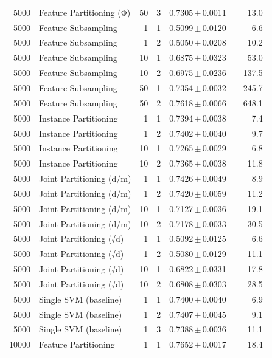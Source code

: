\begin{table}[ht]
\begin{tabular}{rlrrccr}
5000 & Feature Partitioning (Φ) & 50 & 3 & 0.7305\,$\pm$\,0.0011 &  & 13.0 \\
5000 & Feature Subsampling & 1 & 1 & 0.5099\,$\pm$\,0.0120 &  & 6.6 \\
5000 & Feature Subsampling & 1 & 2 & 0.5050\,$\pm$\,0.0208 &  & 10.2 \\
5000 & Feature Subsampling & 10 & 1 & 0.6875\,$\pm$\,0.0323 &  & 53.0 \\
5000 & Feature Subsampling & 10 & 2 & 0.6975\,$\pm$\,0.0236 &  & 137.5 \\
5000 & Feature Subsampling & 50 & 1 & 0.7354\,$\pm$\,0.0032 &  & 245.7 \\
5000 & Feature Subsampling & 50 & 2 & 0.7618\,$\pm$\,0.0066 &  & 648.1 \\
5000 & Instance Partitioning & 1 & 1 & 0.7394\,$\pm$\,0.0038 &  & 7.4 \\
5000 & Instance Partitioning & 1 & 2 & 0.7402\,$\pm$\,0.0040 &  & 9.7 \\
5000 & Instance Partitioning & 10 & 1 & 0.7265\,$\pm$\,0.0029 &  & 6.8 \\
5000 & Instance Partitioning & 10 & 2 & 0.7365\,$\pm$\,0.0038 &  & 11.8 \\
5000 & Joint Partitioning (d/m) & 1 & 1 & 0.7426\,$\pm$\,0.0049 &  & 8.9 \\
5000 & Joint Partitioning (d/m) & 1 & 2 & 0.7420\,$\pm$\,0.0059 &  & 11.2 \\
5000 & Joint Partitioning (d/m) & 10 & 1 & 0.7127\,$\pm$\,0.0036 &  & 19.1 \\
5000 & Joint Partitioning (d/m) & 10 & 2 & 0.7178\,$\pm$\,0.0033 &  & 30.5 \\
5000 & Joint Partitioning (√d) & 1 & 1 & 0.5092\,$\pm$\,0.0125 &  & 6.6 \\
5000 & Joint Partitioning (√d) & 1 & 2 & 0.5080\,$\pm$\,0.0129 &  & 11.1 \\
5000 & Joint Partitioning (√d) & 10 & 1 & 0.6822\,$\pm$\,0.0331 &  & 17.8 \\
5000 & Joint Partitioning (√d) & 10 & 2 & 0.6808\,$\pm$\,0.0303 &  & 28.5 \\
5000 & Single SVM (baseline) & 1 & 1 & 0.7400\,$\pm$\,0.0040 &  & 6.9 \\
5000 & Single SVM (baseline) & 1 & 2 & 0.7407\,$\pm$\,0.0045 &  & 9.1 \\
5000 & Single SVM (baseline) & 1 & 3 & 0.7388\,$\pm$\,0.0036 &  & 11.1 \\
10000 & Feature Partitioning & 1 & 1 & 0.7652\,$\pm$\,0.0017 &  & 18.4 \\

\end{tabular}
\end{table}
